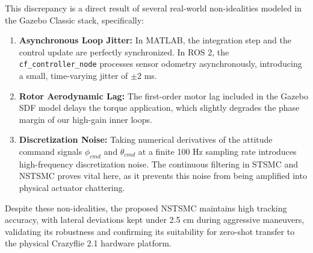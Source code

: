 This discrepancy is a direct result of several real-world non-idealities modeled in the Gazebo Classic stack, specifically:
\begin{enumerate}
    \item \textbf{Asynchronous Loop Jitter:} In MATLAB, the integration step and the control update are perfectly synchronized. In ROS 2, the \texttt{cf\_controller\_node} processes sensor odometry asynchronously, introducing a small, time-varying jitter of $\pm 2$ ms.
    \item \textbf{Rotor Aerodynamic Lag:} The first-order motor lag included in the Gazebo SDF model delays the torque application, which slightly degrades the phase margin of our high-gain inner loops.
    \item \textbf{Discretization Noise:} Taking numerical derivatives of the attitude command signals $\phi_{cmd}$ and $\theta_{cmd}$ at a finite 100 Hz sampling rate introduces high-frequency discretization noise. The continuous filtering in STSMC and NSTSMC proves vital here, as it prevents this noise from being amplified into physical actuator chattering.
\end{enumerate}

Despite these non-idealities, the proposed NSTSMC maintains high tracking accuracy, with lateral deviations kept under 2.5 cm during aggressive maneuvers, validating its robustness and confirming its suitability for zero-shot transfer to the physical Crazyflie 2.1 hardware platform.

